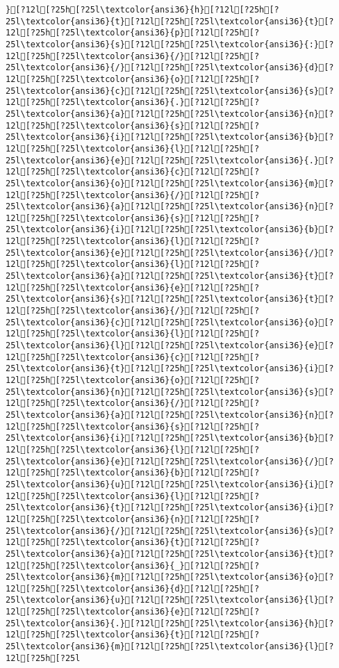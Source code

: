 \documentclass{scrartcl}
\begin{document}
\begin{Verbatim}
}[?12l[?25h[?25l\textcolor{ansi36}{h}[?12l[?25h[?25l\textcolor{ansi36}{t}[?12l[?25h[?25l\textcolor{ansi36}{t}[?12l[?25h[?25l\textcolor{ansi36}{p}[?12l[?25h[?25l\textcolor{ansi36}{s}[?12l[?25h[?25l\textcolor{ansi36}{:}[?12l[?25h[?25l\textcolor{ansi36}{/}[?12l[?25h[?25l\textcolor{ansi36}{/}[?12l[?25h[?25l\textcolor{ansi36}{d}[?12l[?25h[?25l\textcolor{ansi36}{o}[?12l[?25h[?25l\textcolor{ansi36}{c}[?12l[?25h[?25l\textcolor{ansi36}{s}[?12l[?25h[?25l\textcolor{ansi36}{.}[?12l[?25h[?25l\textcolor{ansi36}{a}[?12l[?25h[?25l\textcolor{ansi36}{n}[?12l[?25h[?25l\textcolor{ansi36}{s}[?12l[?25h[?25l\textcolor{ansi36}{i}[?12l[?25h[?25l\textcolor{ansi36}{b}[?12l[?25h[?25l\textcolor{ansi36}{l}[?12l[?25h[?25l\textcolor{ansi36}{e}[?12l[?25h[?25l\textcolor{ansi36}{.}[?12l[?25h[?25l\textcolor{ansi36}{c}[?12l[?25h[?25l\textcolor{ansi36}{o}[?12l[?25h[?25l\textcolor{ansi36}{m}[?12l[?25h[?25l\textcolor{ansi36}{/}[?12l[?25h[?25l\textcolor{ansi36}{a}[?12l[?25h[?25l\textcolor{ansi36}{n}[?12l[?25h[?25l\textcolor{ansi36}{s}[?12l[?25h[?25l\textcolor{ansi36}{i}[?12l[?25h[?25l\textcolor{ansi36}{b}[?12l[?25h[?25l\textcolor{ansi36}{l}[?12l[?25h[?25l\textcolor{ansi36}{e}[?12l[?25h[?25l\textcolor{ansi36}{/}[?12l[?25h[?25l\textcolor{ansi36}{l}[?12l[?25h[?25l\textcolor{ansi36}{a}[?12l[?25h[?25l\textcolor{ansi36}{t}[?12l[?25h[?25l\textcolor{ansi36}{e}[?12l[?25h[?25l\textcolor{ansi36}{s}[?12l[?25h[?25l\textcolor{ansi36}{t}[?12l[?25h[?25l\textcolor{ansi36}{/}[?12l[?25h[?25l\textcolor{ansi36}{c}[?12l[?25h[?25l\textcolor{ansi36}{o}[?12l[?25h[?25l\textcolor{ansi36}{l}[?12l[?25h[?25l\textcolor{ansi36}{l}[?12l[?25h[?25l\textcolor{ansi36}{e}[?12l[?25h[?25l\textcolor{ansi36}{c}[?12l[?25h[?25l\textcolor{ansi36}{t}[?12l[?25h[?25l\textcolor{ansi36}{i}[?12l[?25h[?25l\textcolor{ansi36}{o}[?12l[?25h[?25l\textcolor{ansi36}{n}[?12l[?25h[?25l\textcolor{ansi36}{s}[?12l[?25h[?25l\textcolor{ansi36}{/}[?12l[?25h[?25l\textcolor{ansi36}{a}[?12l[?25h[?25l\textcolor{ansi36}{n}[?12l[?25h[?25l\textcolor{ansi36}{s}[?12l[?25h[?25l\textcolor{ansi36}{i}[?12l[?25h[?25l\textcolor{ansi36}{b}[?12l[?25h[?25l\textcolor{ansi36}{l}[?12l[?25h[?25l\textcolor{ansi36}{e}[?12l[?25h[?25l\textcolor{ansi36}{/}[?12l[?25h[?25l\textcolor{ansi36}{b}[?12l[?25h[?25l\textcolor{ansi36}{u}[?12l[?25h[?25l\textcolor{ansi36}{i}[?12l[?25h[?25l\textcolor{ansi36}{l}[?12l[?25h[?25l\textcolor{ansi36}{t}[?12l[?25h[?25l\textcolor{ansi36}{i}[?12l[?25h[?25l\textcolor{ansi36}{n}[?12l[?25h[?25l\textcolor{ansi36}{/}[?12l[?25h[?25l\textcolor{ansi36}{s}[?12l[?25h[?25l\textcolor{ansi36}{t}[?12l[?25h[?25l\textcolor{ansi36}{a}[?12l[?25h[?25l\textcolor{ansi36}{t}[?12l[?25h[?25l\textcolor{ansi36}{_}[?12l[?25h[?25l\textcolor{ansi36}{m}[?12l[?25h[?25l\textcolor{ansi36}{o}[?12l[?25h[?25l\textcolor{ansi36}{d}[?12l[?25h[?25l\textcolor{ansi36}{u}[?12l[?25h[?25l\textcolor{ansi36}{l}[?12l[?25h[?25l\textcolor{ansi36}{e}[?12l[?25h[?25l\textcolor{ansi36}{.}[?12l[?25h[?25l\textcolor{ansi36}{h}[?12l[?25h[?25l\textcolor{ansi36}{t}[?12l[?25h[?25l\textcolor{ansi36}{m}[?12l[?25h[?25l\textcolor{ansi36}{l}[?12l[?25h[?25l

\end{Verbatim}
\end{document}
